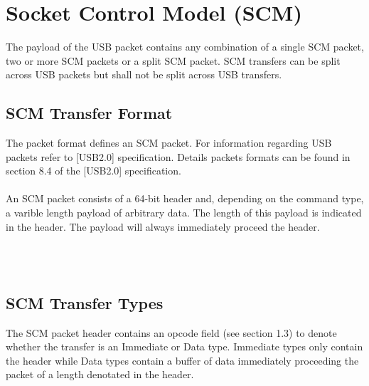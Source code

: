 \documentclass[pstricks,border=12pt,10pt]{article}
\begin{document}
	\section{Socket Control Model (SCM)}
	The payload of the USB packet contains any combination of a single SCM packet, 
	two or more SCM packets or a split SCM packet. SCM transfers can be split across USB packets but shall not be split across USB transfers. 
	\subsection{SCM Transfer Format}
	The packet format defines an SCM packet. For information regarding USB packets refer to [USB2.0] specification. Details packets formats can be found in section 8.4 of the [USB2.0] specification. \\
	\\
	An SCM packet consists of a 64-bit header and, depending on the command type, a varible length payload of arbitrary data. The length of this payload is indicated in the header.  The payload will always immediately proceed the header. \\
	\\
	\centerline {
	} \\
	\subsection{SCM Transfer Types}
	The SCM packet header contains an opcode field (see section 1.3) to denote whether the transfer is an Immediate or Data type. Immediate types only contain the header while Data types contain a buffer of data immediately proceeding the packet of a length denotated in the header.\\
\end{document}
